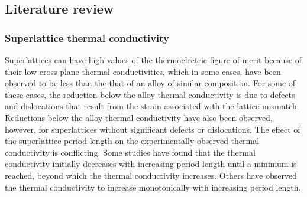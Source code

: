 \documentclass[letterpaper,12pt]{article}
\begin{document}

\subsection{\label{S-Intro-Review}Literature review}

\subsubsection*{Superlattice thermal conductivity}

Superlattices can have high values of the thermoelectric
figure-of-merit because of their low cross-plane thermal
conductivities, which in some cases, have been observed to be less
than the that of an alloy of similar
composition.\cite{capinski1999,chakraborty2003,borca-tasciuc2000,borca-tasciuc2002,venkata2000,caylor2005,lee1997}
For some of these cases, the reduction below the alloy thermal
conductivity is due to defects and dislocations that result from the
strain associated with the lattice mismatch.\cite{kim2006,kim2007}
Reductions below the alloy thermal conductivity have also been
observed, however, for superlattices without significant defects or
dislocations.\cite{kim2007,capinski1999,venkata2000,borca-tasciuc2002}
The effect of the superlattice period length on the experimentally
observed thermal conductivity is conflicting. Some studies have
found that the thermal conductivity initially decreases with
increasing period length until a minimum is reached, beyond which
the thermal conductivity
increases.\cite{chakraborty2003,venkata2000,caylor2005} Others have
observed the thermal conductivity to increase monotonically with
increasing period length.\cite{capinski1999,huxtablethesis}
\end{document}
